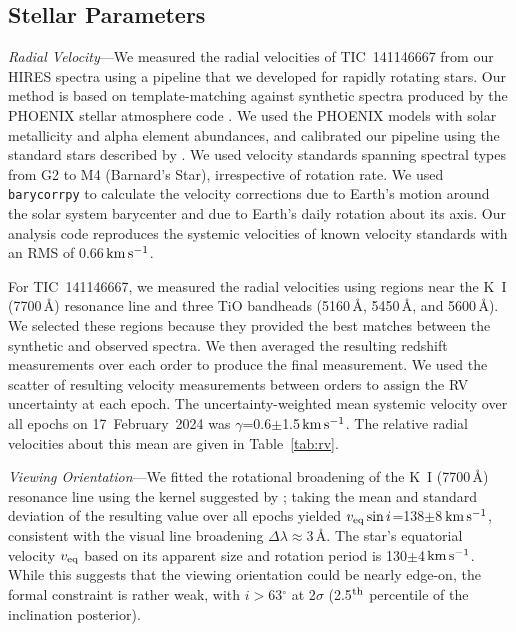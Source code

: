 \documentclass{nature3}
\newcommand{\kms}{\ensuremath{\rm km\,s^{-1}}}
\begin{document}
\begin{methods}
\subsection{Stellar Parameters}\phantom{+}
\label{subsec:stparams}

{\it Radial Velocity}---We measured the radial velocities of TIC~141146667
from our HIRES spectra using a pipeline that we developed for
rapidly rotating stars.  Our method is based on template-matching
against synthetic spectra produced by the PHOENIX stellar atmosphere
code \cite{Husser2013}.  We used the PHOENIX models with solar
metallicity and alpha element abundances, and calibrated our pipeline
using the standard stars described by \cite{Chubak2012}.  We used
velocity standards spanning spectral types from G2 to M4 (Barnard's
Star), irrespective of rotation rate.  We used \texttt{barycorrpy}
\cite{Kanodia2018} to calculate the velocity corrections due to Earth's
motion around the solar system barycenter and due to Earth's daily
rotation about its axis.  Our analysis code reproduces the systemic
velocities of known velocity standards \cite{Chubak2012} with an RMS of
0.66\,\kms.

For TIC~141146667, we measured the radial velocities using regions near
the K~I (7700\,\AA) resonance line and three TiO bandheads (5160\,\AA,
5450\,\AA, and 5600\,\AA).  We selected these regions because they
provided the best matches between the synthetic and observed spectra.
We then averaged the resulting redshift measurements over each order to
produce the final measurement.  We used the scatter of resulting
velocity measurements between orders to assign the RV uncertainty at
each epoch.  The uncertainty-weighted mean systemic velocity over all
epochs on 17~February~2024 was $\gamma$=0.6$\pm$1.5\,\kms.  The
relative radial velocities about this mean are given in
Table~\ref{tab:rv}.

{\it Viewing Orientation}---We fitted the rotational broadening of the
K~I (7700\,\AA) resonance line using the kernel suggested by
\cite{Gray2008}; taking the mean and standard deviation of the resulting
value over all epochs yielded $v_{\rm eq} \sin i$=138$\pm$8\,\kms,
consistent with the visual line broadening $\Delta
\lambda$$\approx$3\,\AA.  The star's equatorial velocity $v_{\rm eq}$
based on its apparent size and rotation period is 130$\pm$4\,\kms.
While this suggests that the viewing orientation could be nearly
edge-on, the formal constraint is rather weak, with $i$$>$63$^\circ$ at
2$\sigma$ (2.5$^{\rm th}$ percentile of the inclination posterior).


\end{methods}
\end{document}
